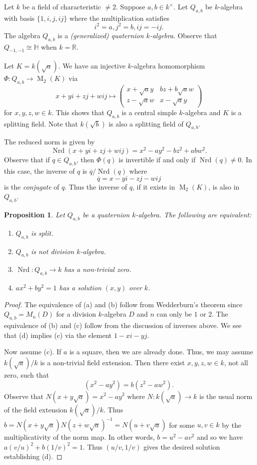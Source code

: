 \documentclass[12pt]{article}
\theoremstyle{plain}
\newtheorem{proposition}[theorem]{Proposition}
\theoremstyle{definition}
\theoremstyle{remark}
\numberwithin{equation}{section}
\begin{document}
Let $k$ be a field of characteristic $\ne 2$.
Suppose $a,b \in k^\times$.
Let $Q_{a,b}$ be $k$-algebra with basis $\{1,i,j,ij\}$ where the
multiplication satisfies
\[
i^2=a, j^2=b, ij=-ij .
\]
The algebra $Q_{a,b}$ is a \emph{(generalized) quaternion $k$-algebra}.
Observe that $Q_{-1,-1} \cong \mathbb{H}$ when $k=\mathbb{R}$.

Let $K=k(\sqrt{a})$.  We have an injective $k$-algebra
homomorphism $\Phi : Q_{a,b} \to \operatorname{M}_2(K)$ via
\[
x+yi+zj+wij \mapsto
\begin{pmatrix}
x+\sqrt{a}y & bz+b\sqrt{a}w\\
z-\sqrt{a}w & x-\sqrt{a}y
\end{pmatrix}
\]
for $x,y,z,w \in k$.
This shows that $Q_{a,b}$ is a central simple $k$-algebra and $K$ is a
splitting field.
Note that $k(\sqrt{b})$ is also a splitting field of $Q_{a,b}$.

The reduced norm is given by
\[
\operatorname{Nrd}(x+yi+zj+wij) = x^2-ay^2-bz^2+abw^2 .
\]
Observe that if $q \in Q_{a,b}$, then $\Phi(q)$ is invertible
if and only if $\operatorname{Nrd}(q) \ne 0$.
In this case, the inverse of $q$ is
$\overline{q}/\operatorname{Nrd}(q)$ where
\[
\overline{q} = x-yi-zj-wij
\]
is the \emph{conjugate} of $q$.
Thus the inverse of $q$, if it exists in $\operatorname{M}_2(K)$,
is also in $Q_{a,b}$.

\begin{proposition}
Let $Q_{a,b}$ be a quaternion $k$-algebra.
The following are equivalent:
\begin{enumerate}
\item[(a)] $Q_{a,b}$ is split.
\item[(b)] $Q_{a,b}$ is not division $k$-algebra.
\item[(c)] $\operatorname{Nrd} : Q_{a,b} \to k$ has a non-trivial zero. 
\item[(d)] $ax^2+by^2=1$ has a solution $(x,y)$ over $k$.
\end{enumerate}
\end{proposition}

\begin{proof}
The equivalence of (a) and (b) follow from Wedderburn's theorem
since $Q_{a,b}=M_n(D)$ for a division $k$-algebra $D$ and
$n$ can only be $1$ or $2$.
The equivalence of (b) and (c) follow from the discussion of inverses
above.
We see that (d) implies (c) via the element $1-xi-yj$.

Now assume (c).
If $a$ is a square, then we are already done.  Thus,
we may assume $k(\sqrt{a})/k$
is a non-trivial field extension.
Then there exist $x,y,z,w \in k$, not all zero,
such that
\[
(x^2-ay^2)=b(z^2-aw^2).
\]
Observe that $N(x+y\sqrt{a})=x^2-ay^2$ where $N : k(\sqrt{a}) \to k$
is the usual norm of the field extension $k(\sqrt{a})/k$.
Thus $b=N(x+y\sqrt{a})N(z+w\sqrt{a})^{-1}=N(u+v\sqrt{a})$
for some $u,v \in k$ by the multiplicativity of the norm map.
In other words, $b = u^2-av^2$ and so we have $a(v/u)^2 + b(1/v)^2=1$.
Thus $(u/v,1/v)$ gives the desired solution establishing (d).
\end{proof}
\end{document}
